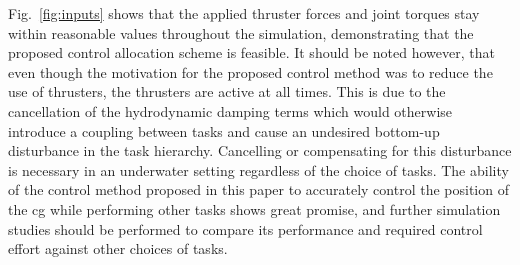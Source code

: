 \documentclass[../main.tex]{subfiles}
\begin{document}
 Fig.~\ref{fig:inputs} shows that the applied thruster forces and joint torques stay within reasonable values throughout the simulation, demonstrating that the proposed control allocation scheme is feasible. It should be noted however, that even though the motivation for the proposed control method was to reduce the use of thrusters, the thrusters are active at all times. This is due to the cancellation of the hydrodynamic damping terms which would otherwise introduce a coupling between tasks and cause an undesired bottom-up disturbance in the task hierarchy. Cancelling or compensating for this disturbance is necessary in an underwater setting regardless of the choice of tasks.
The ability of the control method proposed in this paper to accurately control the position of the \gls{cg} while performing other tasks shows great promise, and further simulation studies should be performed to compare its performance and required control effort against other choices of tasks.

\end{document}
